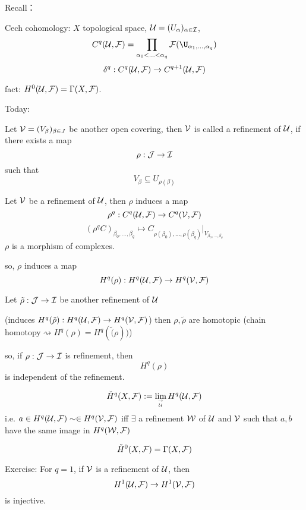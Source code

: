 Recall：

Cech cohomology: $X$ topological space,
$\mathcal{U}=(U_{\alpha})_{\alpha\in\mathcal{I}}$,
$$C^q(\mcalU,\mcalF)=
\prod_{\alpha_0<...<\alpha_q}\mcalF(\U_{\alpha_1,...,\alpha_q})$$
$$\delta^q:C^q(\mathcal{U},\mathcal{F})\to C^{q+1}(\mathcal{U},\mathcal{F})$$

fact: $H^0(\mathcal{U},\mathcal{F})=\Gamma(X,\mathcal{F})$.

Today:

\begin{definition}
Let $\mathcal{V}=(V_{\beta})_{\beta\in J}$ be another open covering,
then $\mathcal{V}$ is called a refinement of $\mathcal{U}$, if there exists a map
$$\rho:\mathcal{J}\to\mathcal{I}$$
such that
$$V_{\beta}\subseteq U_{\rho(\beta)}$$
\end{definition}

\begin{prop}
Let $\mathcal{V}$ be a refinement of $\mathcal{U}$, then $\rho$ induces a map
$$\rho^q:C^q(\mathcal{U},\mathcal{F})\to C^q(\mathcal{V},\mathcal{F})$$
$$(\rho^qC)_{\beta_0,...,\beta_q}\mapsto
C_{\rho(\beta_0),...,\rho(\beta_q)}|_{V_{\beta_0,...,\beta_q}}$$
$\rho$ is a morphism of complexes.
\end{prop}

so, $\rho$ induces a map
$$H^q(\rho):H^q(\mathcal{U},\mathcal{F})\to H^q(\mathcal{V},\mathcal{F})$$

Let $\tilde{\rho}:\mathcal{J}\to\mathcal{I}$ be another refinement of $\mathcal{U}$

(induces $H^q(\tilde{\rho}):H^q(\mathcal{U},\mathcal{F})\to H^q(\mathcal{V},\mathcal{F})$)
then $\rho,\tilde{\rho}$ are homotopic
(chain homotopy$\rightsquigarrow H^q(\rho)=H^q(\tilde(\rho))$)

so, if $\rho:\mathcal{J}\to \mathcal{I}$ is refinement, then
$$H^q(\rho)$$
is independent of the refinement.

\begin{definition}
$$\check{H}^q(X,\mathcal{F}):=\lim_{\to\atop\mathcal{U}} H^q(\mathcal{U},\mathcal{F})$$
i.e. $a\in H^q(\mathcal{U},\mathcal{F})\sim\in H^q(\mathcal{V},\mathcal{F})$ iff
$\exists$ a refinement $\mathcal{W}$ of $\mathcal{U}$ and $\mathcal{V}$ such that
$a,b$ have the same image in $H^q(\mathcal{W},\mathcal{F})$
\end{definition}

\begin{rem}
$$\check{H}^0(X,\mathcal{F})=\Gamma(X,\mathcal{F})$$

Exercise: For $q=1$, if $\mathcal{V}$ is a refinement of $\mathcal{U}$,
then
$$H^1(\mathcal{U},\mathcal{F})\to H^1(\mathcal{V},\mathcal{F})$$
is injective.
\end{rem}

